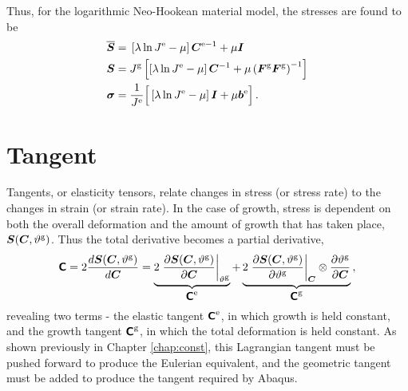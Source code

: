 \documentclass[10pt,letterpaper,oneside]{report}
\newcommand{\ten}[1]{\mbox{\boldmath $#1$}{}}
\newcommand{\tenf}[1]{\mbox{{\sffamily{\bfseries {#1}}}}}
\newcommand{\scas}[1]{\mbox{{\scriptsize{${\rm{#1}}$}}}{}}
\newcommand{\tens}[1]{\mbox{\boldmath{\scriptsize{$#1$}}}{}}
\begin{document}
Thus, for the logarithmic Neo-Hookean material model, the stresses are found to be
\begin{align}
\overline{\ten{S}} ={}& \left[ \lambda \ln J^{\scas{e}} - \mu \right] \ten{C}^{\scas{e}-1} + \mu \ten{I} 
\\
\ten{S} ={}& J^{\scas{g}} \left[ \left[ \lambda \ln J^{\scas{e}} - \mu \right] \ten{C}^{-1} + \mu \left( \ten{F}^{\scas{g}} \ten{F}^{\scas{g}} \right)^{-1} \right] 
\\
\ten{\sigma} ={}& \frac{1}{J^{\scas{e}}} \Big[ \left[ \lambda \ln J^{\scas{e}} - \mu \right] \ten{I} + \mu \ten{b}^{\scas{e}} \Big] \, . 
\end{align}


\newpage
\section{Tangent}
Tangents, or elasticity tensors, relate changes in stress (or stress rate) to the changes in strain (or strain rate).  In the case of growth, stress is dependent on both the overall deformation and the amount of growth that has taken place,
$\ten{S} (\ten{C}, \vartheta^{\scas{g}}) $. Thus the total derivative becomes a partial derivative, 
\begin{equation}
\tenf{C} = 2 \frac{d \ten{S} (\ten{C}, \vartheta^{\scas{g}}) }{d \ten{C} } 
= \underbrace{ 2 \left. \frac{ \partial \ten{S} (\ten{C}, \vartheta^{\scas{g}}) }{ \partial \ten{C} } \right|_{\vartheta^{\scas{g}}} }_{ \tenf{C}^{\scas{e}} } + \underbrace{ 2 \left. \frac{\partial \ten{S} (\ten{C}, \vartheta^{\scas{g}}) }{\partial \vartheta^{\scas{g}}} \right|_{\tens{C} } \otimes \frac{ \partial \vartheta^{\scas{g}} }{ \partial \ten{C} } }_{ \tenf{C}^{\scas{g}} } \, , 
\end{equation}
revealing two terms - the elastic tangent $\tenf{C}^{\scas{e}}$, in which growth is held constant, and the growth tangent $\tenf{C}^{\scas{g}}$, in which the total deformation is held constant.  
As shown previously in Chapter \ref{chap:const}, this Lagrangian tangent must be pushed forward to produce the Eulerian equivalent, and the geometric tangent must be added to produce the tangent required by Abaqus.  
\end{document}
